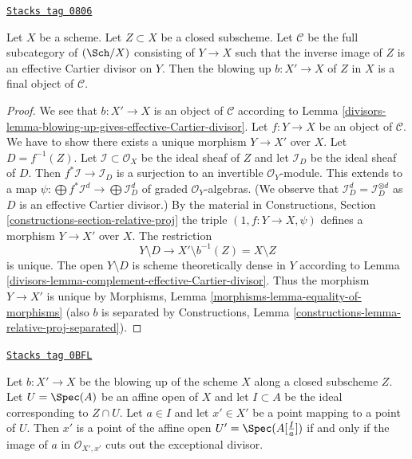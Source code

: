 \begin{lemma}

\label{divisors-lemma-universal-property-blowing-up}
\href{https://stacks.math.columbia.edu/tag/0806}{\texttt{Stacks tag 0806}}

Let $X$ be a scheme. Let $Z \subset X$ be a closed subscheme.
Let $\mathcal{C}$ be the full subcategory of $(\Sch/X)$ consisting
of $Y \to X$ such that the inverse image of $Z$ is an effective
Cartier divisor on $Y$. Then the blowing up $b : X' \to X$ of $Z$ in $X$
is a final object of $\mathcal{C}$.
\end{lemma}

\begin{proof}

We see that $b : X' \to X$ is an object of $\mathcal{C}$ according to
Lemma \ref{divisors-lemma-blowing-up-gives-effective-Cartier-divisor}.
Let $f : Y \to X$ be an object of $\mathcal{C}$. We have to show there exists
a unique morphism $Y \to X'$ over $X$. Let $D = f^{-1}(Z)$.
Let $\mathcal{I} \subset \mathcal{O}_X$ be the ideal sheaf of $Z$
and let $\mathcal{I}_D$ be the ideal sheaf of $D$. Then
$f^*\mathcal{I} \to \mathcal{I}_D$ is a surjection
to an invertible $\mathcal{O}_Y$-module. This extends to a map
$\psi : \bigoplus f^*\mathcal{I}^d \to \bigoplus \mathcal{I}_D^d$
of graded $\mathcal{O}_Y$-algebras. (We observe that
$\mathcal{I}_D^d = \mathcal{I}_D^{\otimes d}$ as $D$ is an
effective Cartier divisor.) By the material in
Constructions, Section \ref{constructions-section-relative-proj}
the triple $(1, f : Y \to X, \psi)$ defines a morphism $Y \to X'$ over $X$.
The restriction
$$
Y \setminus D \longrightarrow X' \setminus b^{-1}(Z) = X \setminus Z
$$
is unique. The open $Y \setminus D$ is scheme theoretically dense in $Y$
according to Lemma \ref{divisors-lemma-complement-effective-Cartier-divisor}.
Thus the morphism $Y \to X'$ is unique by
Morphisms, Lemma \ref{morphisms-lemma-equality-of-morphisms}
(also $b$ is separated by Constructions, Lemma
\ref{constructions-lemma-relative-proj-separated}).
\end{proof}

\begin{lemma}
\label{divisors-lemma-characterize-affine-blowup}
\href{https://stacks.math.columbia.edu/tag/0BFL}{\texttt{Stacks tag 0BFL}}

Let $b : X' \to X$ be the blowing up of the scheme $X$ along a closed
subscheme $Z$. Let $U = \Spec(A)$ be an affine open of $X$ and let
$I \subset A$ be the ideal corresponding to $Z \cap U$.
Let $a \in I$ and let $x' \in X'$ be a point mapping to a point of $U$.
Then $x'$ is a point of the affine open $U' = \Spec(A[\frac{I}{a}])$
if and only if the image of $a$ in $\mathcal{O}_{X', x'}$ cuts
out the exceptional divisor.
\end{lemma}

